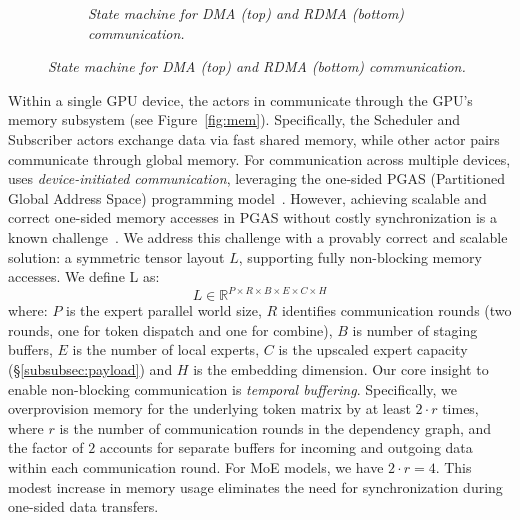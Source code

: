 \begin{figure}[!ht]
\begin{subfigure}{0.36\textwidth}
        \caption{\emph{State machine for DMA (top) and RDMA (bottom) communication.}}
        \label{fig:sm}
    \end{subfigure}
\end{figure}

Within a single GPU device, the actors in \sysname communicate through the GPU's memory subsystem (see Figure~\ref{fig:mem}).
Specifically, the Scheduler and Subscriber actors exchange data via fast shared memory, while other actor pairs communicate through global memory. For communication across multiple devices, \sysname uses \emph{device-initiated communication}, leveraging the one-sided PGAS (Partitioned Global Address Space) programming model~\cite{10.1145/1278177.1278183}.
However, achieving scalable and correct one-sided memory accesses in PGAS without costly synchronization
is a known challenge~\cite{deepep, triton-dist}.
We address this challenge with a provably correct and scalable solution: a symmetric tensor layout $L$,
supporting fully non-blocking memory accesses.
We define L as:\\
\[
    L \in \mathbb{R}^{P\times R \times B \times E \times C \times H}
\]
where: $P$ is the expert parallel world size, $R$ identifies communication rounds (\ie two rounds, one for token dispatch and one for combine), $B$ is number of staging buffers,
$E$ is the number of local experts, $C$ is the upscaled expert capacity (\S\ref{subsubsec:payload}) and $H$ is the embedding dimension.
Our core insight to enable non-blocking communication is \emph{temporal buffering}.
Specifically, we overprovision memory for the underlying token matrix by at least $2 \cdot r$ times, where $r$ is the number of communication rounds in the dependency graph, and the factor of $2$ accounts for separate buffers for incoming and outgoing data within each communication round. For MoE models, we have $2 \cdot r = 4$.
This modest increase in memory usage eliminates the need for synchronization during one-sided data transfers.
